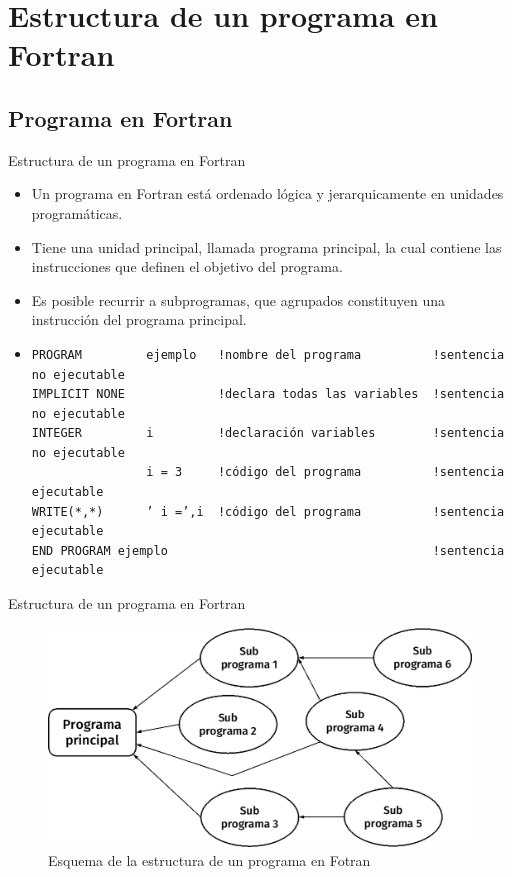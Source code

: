 
\section{Estructura de un programa en Fortran}


\subsection{Programa en Fortran}
\begin{frame}[fragile]{Estructura de un programa en Fortran}
  \begin{itemize}[<+(1)->]
   \item Un programa en Fortran está ordenado lógica y jerarquicamente en unidades programáticas. 
   \item Tiene una unidad principal, llamada programa principal, la cual contiene las instrucciones que definen el objetivo del programa.
   \item Es posible recurrir a subprogramas, que agrupados constituyen una instrucción del programa principal. 
   \item [] 
   
   \begin{verbatim}
PROGRAM         ejemplo   !nombre del programa          !sentencia no ejecutable
IMPLICIT NONE             !declara todas las variables  !sentencia no ejecutable                               
INTEGER         i         !declaración variables        !sentencia no ejecutable
                i = 3     !código del programa          !sentencia ejecutable
WRITE(*,*)      ’ i =’,i  !código del programa          !sentencia ejecutable
END PROGRAM ejemplo                                     !sentencia ejecutable
  \end{verbatim}
\end{itemize} 
\end{frame}

\begin{frame}[fragile]{Estructura de un programa en Fortran}
 \begin{figure}
  \includegraphics[width=1\textwidth]{./resources/structurep.png}
  \caption{Esquema de la estructura de un programa en Fotran}
 \end{figure}
\end{frame}
